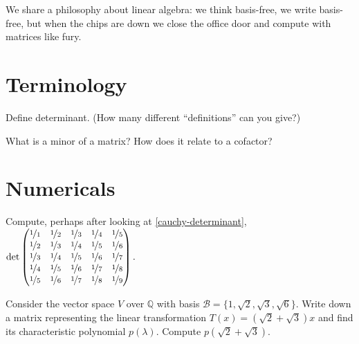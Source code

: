 \documentclass{homework}
\author{Jim Fowler}
\begin{document}
\maketitle

\begin{inspiration}
  We share a philosophy about linear algebra: we think basis-free, we
  write basis-free, but when the chips are down we close the office
  door and compute with matrices like fury.  
\end{inspiration}

\section{Terminology}

\begin{problem}
  Define determinant.  (How many different ``definitions'' can you give?)
\end{problem}

\begin{problem}
  What is a minor of a matrix?  How does it relate to a cofactor?
\end{problem}

\section{Numericals}

\begin{problem}\label{very-small-determinant}Compute, perhaps after looking at \ref{cauchy-determinant}, \(
    \det \displaystyle\begin{pmatrix}
\nicefrac{1}{1} & \nicefrac{1}{2} & \nicefrac{1}{3} & \nicefrac{1}{4} & \nicefrac{1}{5} \\
\nicefrac{1}{2} & \nicefrac{1}{3} & \nicefrac{1}{4} & \nicefrac{1}{5} & \nicefrac{1}{6} \\
\nicefrac{1}{3} & \nicefrac{1}{4} & \nicefrac{1}{5} & \nicefrac{1}{6} & \nicefrac{1}{7} \\
\nicefrac{1}{4} & \nicefrac{1}{5} & \nicefrac{1}{6} & \nicefrac{1}{7} & \nicefrac{1}{8} \\
\nicefrac{1}{5} & \nicefrac{1}{6} & \nicefrac{1}{7} & \nicefrac{1}{8} & \nicefrac{1}{9}
\end{pmatrix}.\) \\
\end{problem}

\begin{problem}
  Consider the vector space $V$ over $\mathbb{Q}$ with basis
  $ \mathcal{B} = \{1,\sqrt{2},\sqrt{3},\sqrt{6}\}$.  Write down a
  matrix representing the linear transformation
  $T(x) = (\sqrt{2} + \sqrt{3})x$ and find its characteristic
  polynomial $p(\lambda)$.  Compute $p(\sqrt{2} + \sqrt{3})$.
\end{problem}
\end{document}

